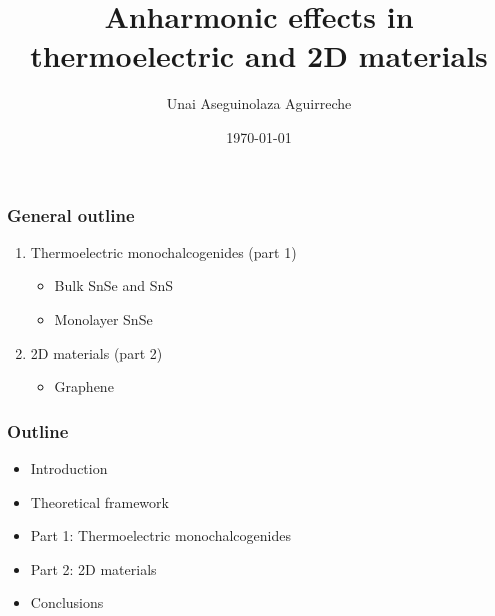 \documentclass{beamer}
\author{Unai Aseguinolaza Aguirreche}
\title{Anharmonic effects in thermoelectric and 2D materials}
\institute{Supervided by Aitor Bergara and Ion Errea}
\date{\today}
\begin{document}


\begin{frame}
 \titlepage
\end{frame}

\begin{frame}

\frametitle{General outline}
\begin{enumerate}
	\item Thermoelectric monochalcogenides (part 1)
	\begin{itemize}
		\item Bulk SnSe and SnS
		\item Monolayer SnSe
	\end{itemize}
	\vspace{2cm}
\item 2D materials (part 2)
	\begin{itemize}
		\item Graphene
	\end{itemize}
\end{enumerate}

\end{frame}


\begin{frame}

\frametitle{Outline}
\begin{itemize}
\item Introduction
\vspace{0.5cm}
\item Theoretical framework
\vspace{0.5cm}
\item Part 1: Thermoelectric monochalcogenides
\vspace{0.5cm}
\item Part 2: 2D materials
\vspace{0.5cm}
\item Conclusions
\end{itemize}

\end{frame}

\end{document}
